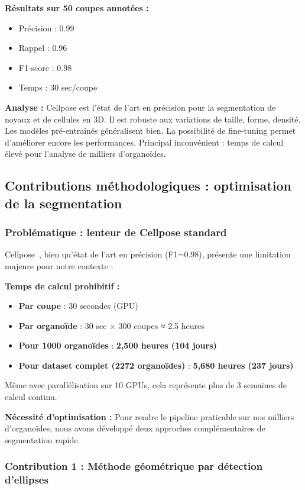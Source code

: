 \textbf{Résultats sur 50 coupes annotées :}
\begin{itemize}
    \item Précision : 0.99
    \item Rappel : 0.96
    \item F1-score : 0.98
    \item Temps : 30 sec/coupe
\end{itemize}

\textbf{Analyse :}
Cellpose est l'état de l'art en précision pour la segmentation de noyaux et de cellules en 3D. Il est robuste aux variations de taille, forme, densité. Les modèles pré-entraînés généralisent bien. La possibilité de fine-tuning permet d'améliorer encore les performances. Principal inconvénient : temps de calcul élevé pour l'analyse de milliers d'organoïdes.

\subsection{Contributions méthodologiques : optimisation de la segmentation}

\subsubsection{Problématique : lenteur de Cellpose standard}

Cellpose~\cite{Stringer2021}, bien qu'état de l'art en précision (F1=0.98), présente une limitation majeure pour notre contexte :

\textbf{Temps de calcul prohibitif :}
\begin{itemize}
    \item \textbf{Par coupe} : 30 secondes (GPU)
    \item \textbf{Par organoïde} : 30 sec × 300 coupes ≈ 2.5 heures
    \item \textbf{Pour 1000 organoïdes} : \textbf{2,500 heures (104 jours)}
    \item \textbf{Pour dataset complet (2272 organoïdes)} : \textbf{5,680 heures (237 jours)}
\end{itemize}

Même avec parallélisation sur 10 GPUs, cela représente plus de 3 semaines de calcul continu.

\textbf{Nécessité d'optimisation :}
Pour rendre le pipeline praticable sur nos milliers d'organoïdes, nous avons développé deux approches complémentaires de segmentation rapide.

\subsubsection{Contribution 1 : Méthode géométrique par détection d'ellipses}

